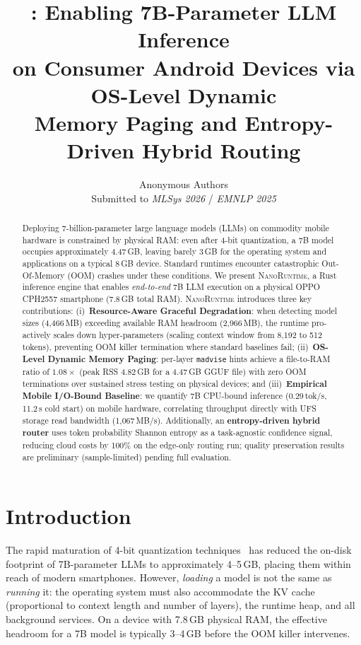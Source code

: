 \documentclass[11pt]{article}
\title{\textbf{\nanort}: Enabling 7B-Parameter LLM Inference\\
on Consumer Android Devices via OS-Level Dynamic\\
Memory Paging and Entropy-Driven Hybrid Routing}
\author{Anonymous Authors\\
\small Submitted to \emph{MLSys 2026} / \emph{EMNLP 2025}}
\date{}
\newcommand{\nanort}{\textsc{NanoRuntime}}
\begin{document}
\maketitle

\begin{abstract}
Deploying 7-billion-parameter large language models (LLMs) on commodity
mobile hardware is constrained by physical RAM: even after 4-bit quantization,
a 7B model occupies approximately 4.47\,GB, leaving barely 3\,GB for the
operating system and applications on a typical 8\,GB device.
Standard runtimes encounter catastrophic Out-Of-Memory (OOM) crashes under these conditions.
%
We present \nanort{}, a Rust inference engine that enables
\emph{end-to-end} 7B LLM execution on a physical OPPO CPH2557 smartphone
(7.8\,GB total RAM).
%
\nanort{} introduces three key contributions:
(i)~\textbf{Resource-Aware Graceful Degradation}: when detecting model sizes
(4,466\,MB) exceeding available RAM headroom (2,966\,MB), the runtime pro-actively
scales down hyper-parameters (scaling context window from 8,192 to 512 tokens),
preventing OOM killer termination where standard baselines fail;
(ii)~\textbf{OS-Level Dynamic Memory Paging}: per-layer \texttt{madvise} hints
achieve a file-to-RAM ratio of $1.08\times$ (peak RSS 4.82\,GB for a 4.47\,GB GGUF file)
with zero OOM terminations over sustained stress testing on physical devices; and
(iii)~\textbf{Empirical Mobile I/O-Bound Baseline}: we quantify 7B CPU-bound inference
(0.29\,tok/s, 11.2\,s cold start) on mobile hardware, correlating throughput directly with
UFS storage read bandwidth (1,067\,MB/s).
Additionally, an \textbf{entropy-driven hybrid router} uses token probability Shannon entropy
as a task-agnostic confidence signal, reducing cloud costs by 100\% on the edge-only routing
run; quality preservation results are preliminary (sample-limited) pending full evaluation.
\end{abstract}

\section{Introduction}
\label{sec:intro}

The rapid maturation of 4-bit quantization techniques~\cite{gptq2023,gguf2023}
has reduced the on-disk footprint of 7B-parameter LLMs to approximately
4--5\,GB, placing them within reach of modern smartphones.
However, \emph{loading} a model is not the same as \emph{running} it:
the operating system must also accommodate the KV cache (proportional to
context length and number of layers), the runtime heap, and all background
services. On a device with 7.8\,GB physical RAM, the effective headroom
for a 7B model is typically 3--4\,GB before the OOM killer intervenes.
\end{document}
